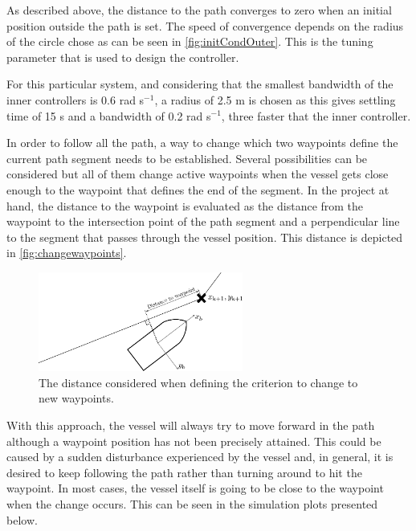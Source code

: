 As described above, the distance to the path converges to zero when an initial position outside the path is set. The speed of convergence depends on the radius of the circle chose as can be seen in \autoref{fig:initCondOuter}. This is the tuning parameter that is used to design the controller.

For this particular system, and considering that the smallest bandwidth of the inner controllers is \num{0.6} rad s$^{-1}$, a radius of \num{2.5} m is chosen as this gives settling time of 15 s and a bandwidth of \num{0.2} rad s$^{-1}$, three faster that the inner controller.

In order to follow all the path, a way to change which two waypoints define the current path segment needs to be established. Several possibilities can be considered but all of them change active waypoints when the vessel gets close enough to the waypoint that defines the end of the segment. In the project at hand, the distance to the waypoint is evaluated as the distance from the waypoint to the intersection point of the path segment and a perpendicular line to the segment that passes through the vessel position. This distance is depicted in \autoref{fig:changewaypoints}.
\begin{figure}[H]
	\includegraphics[width=0.6\textwidth]{figures/LOSalgorithmdistancewp}
	\caption{The distance considered when defining the criterion to change to new waypoints.}
	\label{fig:changewaypoints}
\end{figure}
With this approach, the vessel will always try to move forward in the path although a waypoint position has not been precisely attained. %
This could be caused by a sudden disturbance experienced by the vessel and, in general, it is desired to keep following the path rather than turning around to hit the waypoint. In most cases, the vessel itself is going to be close to the waypoint when the change occurs. This can be seen in the simulation plots presented below. 

	



